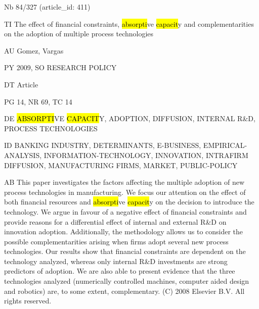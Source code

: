 \documentclass[a4paper]{article}
\begin{document}
\vspace*{-2cm}
Nb \tabto{0cm}84/327 (article\_id: 411)\par
TI \tabto{0cm}The effect of financial constraints, \hl{absorpti}ve \hl{capacit}y and complementarities on the adoption of multiple process technologies\par
AU \tabto{0cm}Gomez, Vargas\par
PY \tabto{0cm}2009, SO RESEARCH POLICY\par
DT \tabto{0cm}Article\par
PG \tabto{0cm}14, NR 69, TC 14\par
DE \tabto{0cm}\hl{ABSORPTI}VE \hl{CAPACIT}Y, ADOPTION, DIFFUSION, INTERNAL R\&D, PROCESS TECHNOLOGIES\par
ID \tabto{0cm}BANKING INDUSTRY, DETERMINANTS, E-BUSINESS, EMPIRICAL-ANALYSIS, INFORMATION-TECHNOLOGY, INNOVATION, INTRAFIRM DIFFUSION, MANUFACTURING FIRMS, MARKET, PUBLIC-POLICY\par
AB \tabto{0cm}This paper investigates the factors affecting the multiple adoption of new process technologies in manufacturing. We focus our attention on the effect of both financial resources and \hl{absorpti}ve \hl{capacit}y on the decision to introduce the technology. We argue in favour of a negative effect of financial constraints and provide reasons for a differential effect of internal and external R\&D on innovation adoption. Additionally, the methodology allows us to consider the possible complementarities arising when firms adopt several new process technologies. Our results show that financial constraints are dependent on the technology analyzed, whereas only internal R\&D investments are strong predictors of adoption. We are also able to present evidence that the three technologies analyzed (numerically controlled machines, computer aided design and robotics) are, to some extent, complementary. (C) 2008 Elsevier B.V. All rights reserved.\par
\clearpage
\end{document}
